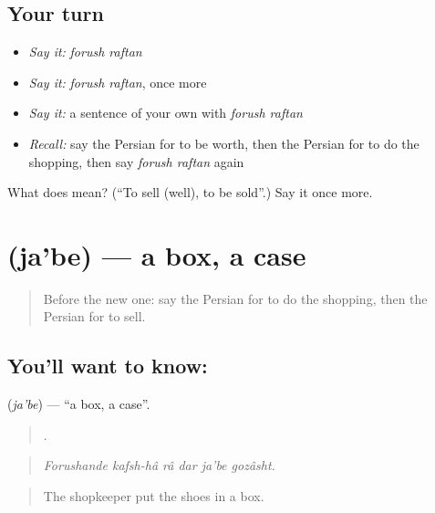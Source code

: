 \subsection*{Your turn}
\begin{itemize}
\raggedright
  \item \emph{Say it:} \emph{forush raftan}
  \item \emph{Say it:} \emph{forush raftan}, once more
  \item \emph{Say it:} a sentence of your own with \emph{forush raftan}
  \item \emph{Recall:} say the Persian for to be worth, then the Persian for to do the shopping, then say \emph{forush raftan} again
\end{itemize}

\begin{tcolorbox}[breakable,colback=teal!4,colframe=teal!35!black,title={Before you move on}]
What does   mean? (\textquotedblleft{}To sell (well), to be sold\textquotedblright{}.) Say it once more.
\end{tcolorbox}
\section[\texorpdfstring{\fa{جعبه} (ja'be)}{جعبه (ja'be)}]{ (ja'be) — a box, a case}

\label{lesson:FA-C462-jabe}



\begin{quote}
Before the new one: say the Persian for to do the shopping, then the Persian for to sell.
\end{quote}

\subsection*{You'll want to know: }
\textbf{} (\emph{ja'be}) — \textquotedblleft{}a box, a case\textquotedblright{}.

\begin{quote}
     .
\end{quote}

\begin{quote}
\emph{Forushande kafsh-hâ râ dar ja'be gozâsht.}
\end{quote}

\begin{quote}
The shopkeeper put the shoes in a box.
\end{quote}

